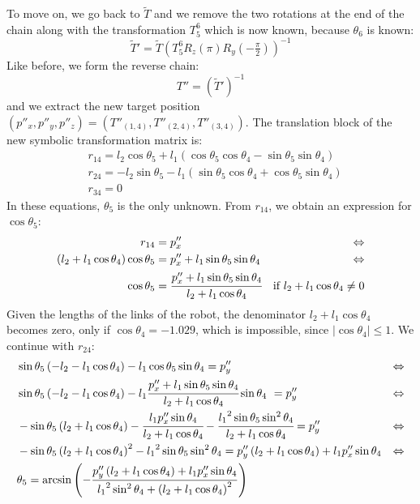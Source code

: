 To move on, we go back to $\widetilde{T}$ and we remove the two rotations at the end of the chain along with the transformation $T^6_5$ which is now known, because $\theta_6$ is known:
\[
\widetilde{T}' = \widetilde{T}\left(T^6_5R_z\left(\pi\right)R_y(-\tfrac{\pi}{2})\right)^{-1}
\]
Like before, we form the reverse chain: 
\[
T'' = \left( \widetilde{T}' \right) ^{-1}
\]
and we extract the new target position $(p''_x, p''_y, p''_z) = (T''_{(1,4)}, T''_{(2,4)}, T''_{(3,4)})$. The translation block of the new symbolic transformation matrix is:
\begin{align*}
&r_{14} = l_2\cos\theta_5 + l_1\left(\cos\theta_5\cos\theta_4 - \sin\theta_5\sin\theta_4\right)\\
&r_{24} = -l_2\sin\theta_5 - l_1\left(\sin\theta_5\cos\theta_4 + \cos\theta_5\sin\theta_4\right)\\
&r_{34} = 0
\end{align*}
In these equations, $\theta_5$ is the only unknown. From $r_{14}$, we obtain an expression for $\cos\theta_5$:
\begin{align*}
r_{14} &= p''_x & \Leftrightarrow\\
\left(l_2+l_1\cos\theta_4\right) \cos\theta_5 &= p''_x + l_1\sin\theta_5\sin\theta_4 & \Leftrightarrow\\
\cos\theta_5 &= \cfrac{p''_x + l_1\sin\theta_5\sin\theta_4}{l_2+l_1\cos\theta_4}&\text{if }l_2+l_1\cos\theta_4\neq0
\end{align*}
Given the lengths of the links of the robot, the denominator $l_2+l_1\cos\theta_4$ becomes zero, only if $\cos\theta_4 = -1.029$, which is impossible, since $|\cos\theta_4| \le 1$. We continue with $r_{24}$: 
\begin{align*}
&\sin\theta_5\left(-l_2-l_1\cos\theta_4\right) - l_1\cos\theta_5\sin\theta_4 = p''_y& \Leftrightarrow\\
&\sin\theta_5\left(-l_2-l_1\cos\theta_4\right) - l_1\cfrac{p''_x + l_1\sin\theta_5\sin\theta_4}{l_2+l_1\cos\theta_4}\sin\theta_4\ =p''_y & \Leftrightarrow\\
&-\sin\theta_5\left(l_2+l_1\cos\theta_4\right) - \cfrac{l_1p''_x\sin\theta_4}{l_2+l_1\cos\theta_4} - \cfrac{{l_1}^2\sin\theta_5\sin^2\theta_4}{l_2+l_1\cos\theta_4} = p''_y&\Leftrightarrow\\
&-\sin\theta_5\left(l_2+l_1\cos\theta_4\right)^2 - {l_1}^2\sin\theta_5\sin^2\theta_4 = p''_y\left(l_2+l_1\cos\theta_4\right) + l_1p''_x\sin\theta_4 & \Leftrightarrow\\
&\theta_5 = \arcsin\left(-\frac{p''_y\left(l_2+l_1\cos\theta_4\right) + l_1p''_x\sin\theta_4}{{l_1}^2\sin^2\theta_4 + \left(l_2 + l_1\cos\theta_4\right)^2}\right)
\end{align*}
